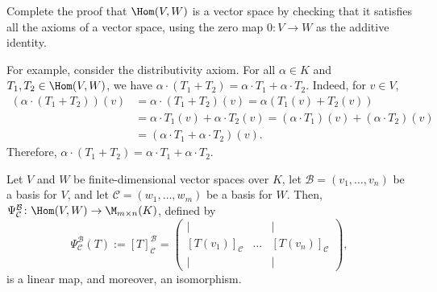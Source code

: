 \begin{exercise}
  Complete the proof that $\Hom(V,W)$ is a vector space by checking that it satisfies all the axioms of a vector space, using the zero map $0 \colon V \to W$ as the additive identity.
\end{exercise}

For example, consider the distributivity axiom. For all $\alpha \in K$ and $T_1, T_2 \in \Hom(V,W)$, we have $\alpha \cdot (T_1 + T_2) = \alpha \cdot T_1 + \alpha \cdot T_2$. Indeed, for $v \in V$,
\begin{align*}
  (\alpha \cdot (T_1 + T_2))(v) &= \alpha \cdot (T_1 + T_2)(v) = \alpha(T_1(v) + T_2(v)) \\
  &= \alpha \cdot T_1(v) + \alpha \cdot T_2(v) = (\alpha \cdot T_1)(v) + (\alpha \cdot T_2)(v) \\
  &= (\alpha \cdot T_1 + \alpha \cdot T_2)(v).
\end{align*}
Therefore, $\alpha \cdot (T_1 + T_2) = \alpha \cdot T_1 + \alpha \cdot T_2$.

\begin{theorem}
  \label{thm:homomorphism_isomorphism}
  Let $V$ and $W$ be finite-dimensional vector spaces over $K$, let $\mathcal{B} = (v_1, \dots, v_n)$ be a basis for $V$, and let $\mathcal{C} = (w_1, \dots, w_m)$ be a basis for $W$. Then, $\Psi_{\mathcal{C}}^{\mathcal{B}} \colon \Hom(V,W) \to \M_{m \times n}(K)$, defined by
  \[ \Psi_{\mathcal{C}}^{\mathcal{B}}(T) := [T]_{\mathcal{C}}^{\mathcal{B}} = \begin{pmatrix} | & & | \\ [T(v_1)]_{\mathcal{C}} & \dots & [T(v_n)]_{\mathcal{C}} \\ | & & | \end{pmatrix}, \]
  is a linear map, and moreover, an isomorphism.
\end{theorem}

